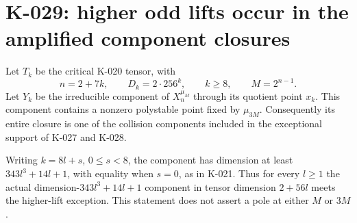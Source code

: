 \section{K-029: higher odd lifts occur in the amplified component closures}

\begin{theorem}[K-029]
Let $T_k$ be the critical K-020 tensor, with
\[
 n=2+7k,\qquad D_k=2\cdot256^k,\qquad k\ge8,
 \qquad M=2^{n-1}.
\]
Let $Y_k$ be the irreducible component of $X_n^{\mu_M}$ through
its quotient point $x_k$.  This component contains a nonzero
polystable point fixed by $\mu_{3M}$.  Consequently its entire
closure is one of the collision components included in the
exceptional support of K-027 and K-028.

Writing $k=8l+s$, $0\le s<8$, the component has dimension at
least $343l^3+14l+1$, with equality when $s=0$, as in K-021.
Thus for every $l\ge1$ the actual dimension-$343l^3+14l+1$
component in tensor dimension $2+56l$ meets the higher-lift
exception.  This statement does not assert a pole at either
$M$ or $3M$.
\end{theorem}

